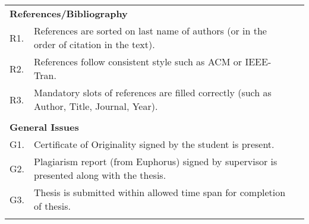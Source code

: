 \begin{table}[!ht]
\begin{adjustbox}{width=\linewidth,center}
\begin{tabular}{p{0.6cm}p{9cm}p{0.6cm}}
                          &                                                                                                                                      &                       \\ \midrule
\multicolumn{3}{|l|}{\textbf{References/Bibliography}}                                                                                                                                   \\ \midrule
\multicolumn{1}{|l|}{R1.} & \multicolumn{1}{l|}{References are   sorted on last name of authors (or in the order of citation in the text).}                      & \multicolumn{1}{l|}{} \\ \midrule
\multicolumn{1}{|l|}{R2.} & \multicolumn{1}{l|}{References follow   consistent style such as ACM or IEEE-Tran.}                                                  & \multicolumn{1}{l|}{} \\ \midrule
\multicolumn{1}{|l|}{R3.} & \multicolumn{1}{l|}{Mandatory slots of   references are filled correctly (such as Author, Title, Journal, Year).}                    & \multicolumn{1}{l|}{} \\ \midrule
                          &                                                                                                                                      &                       \\ \midrule
\multicolumn{3}{|l|}{\textbf{General Issues}}                                                                                                                                            \\ \midrule
\multicolumn{1}{|l|}{G1.} & \multicolumn{1}{l|}{Certificate of Originality signed by   the student is present.}                                                  & \multicolumn{1}{l|}{} \\ \midrule
\multicolumn{1}{|l|}{G2.} & \multicolumn{1}{l|}{Plagiarism   report (from Euphorus) signed by supervisor is presented along with the   thesis.}                  & \multicolumn{1}{l|}{} \\ \midrule
\multicolumn{1}{|l|}{G3.} & \multicolumn{1}{l|}{Thesis is submitted   within allowed time span for completion of thesis.}                                        & \multicolumn{1}{l|}{} \\ \midrule
                          &                                                                                                                                      &                       \\ \midrule

\end{tabular}
\end{adjustbox}
\end{table}

